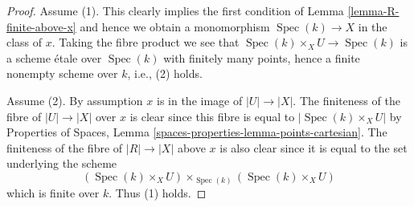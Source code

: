 \documentclass{stacks-project}
\theoremstyle{plain}
\theoremstyle{definition}
\theoremstyle{remark}
\numberwithin{equation}{subsection}
\def\Spec{\mathop{\mathrm{Spec}}}
\begin{document}
\begin{proof}
Assume (1). This clearly implies the first condition of
Lemma \ref{lemma-R-finite-above-x} and hence we obtain a monomorphism
$\Spec(k) \to X$ in the class of $x$. Taking the fibre product
we see that $\Spec(k) \times_X U \to \Spec(k)$ is a scheme
\'etale over $\Spec(k)$ with finitely many points, hence a finite
nonempty scheme over $k$, i.e., (2) holds.

\medskip\noindent
Assume (2). By assumption $x$ is in the image of
$|U| \to |X|$. The finiteness of the fibre of
$|U| \to |X|$ over $x$ is clear since this fibre is equal to
$|\Spec(k) \times_X U|$ by
Properties of Spaces,
Lemma \ref{spaces-properties-lemma-points-cartesian}.
The finiteness of the fibre of $|R| \to |X|$ above $x$ is also clear
since it is equal to the set underlying the scheme
$$
(\Spec(k) \times_X U) \times_{\Spec(k)} (\Spec(k) \times_X U)
$$
which is finite over $k$. Thus (1) holds.
\end{proof}
\end{document}
